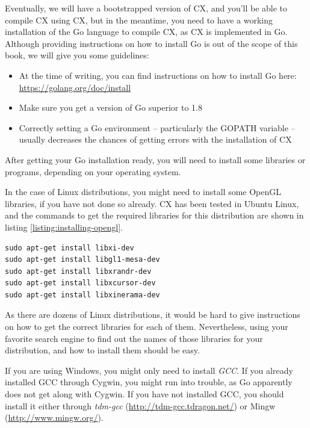 \documentclass[11pt,fleqn,openany]{book} %
\begin{document}
Eventually, we will have a bootstrapped version of CX, and you'll be able to compile CX using CX, but in the meantime, you need to have a working installation of the Go language to compile CX, as CX is implemented in Go. Although providing instructions on how to install Go is out of the scope of this book, we will give you some guidelines:

\begin{itemize}
\item At the time of writing, you can find instructions on how to install Go here: \url{https://golang.org/doc/install}
\item Make sure you get a version of Go superior to 1.8
\item Correctly setting a Go environment -- particularly the GOPATH variable -- usually decreases the chances of getting errors with the installation of CX
\end{itemize}

After getting your Go installation ready, you will need to install some libraries or programs, depending on your operating system.

In the case of Linux distributions, you might need to install some OpenGL libraries, if you have not done so already. CX has been tested in Ubuntu Linux, and the commands to get the required libraries for this distribution are shown in listing \ref{listing:installing-opengl}.

\begin{lstlisting}[caption={Installing required OpenGL libraries in Ubuntu},captionpos=b,label={listing:installing-opengl}]
sudo apt-get install libxi-dev
sudo apt-get install libgl1-mesa-dev
sudo apt-get install libxrandr-dev
sudo apt-get install libxcursor-dev
sudo apt-get install libxinerama-dev
\end{lstlisting}

As there are dozens of Linux distributions, it would be hard to give instructions on how to get the correct libraries for each of them. Nevertheless, using your favorite search engine to find out the names of those libraries for your distribution, and how to install them should be easy.

If you are using Windows, you might only need to install \emph{GCC}. If you already installed GCC through Cygwin, you might run into trouble, as Go apparently does not get along with Cygwin. If you have not installed GCC, you should install it either through \emph{tdm-gcc} (\url{http://tdm-gcc.tdragon.net/}) or Mingw (\url{http://www.mingw.org/}).
\end{document}
